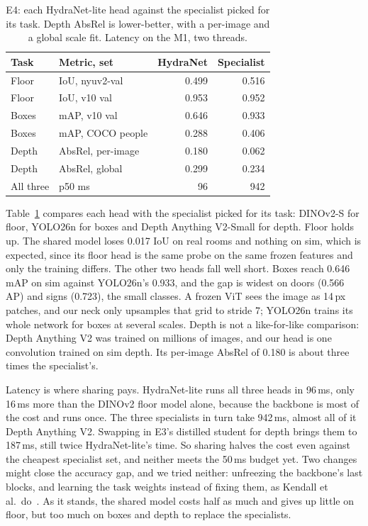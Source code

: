 \documentclass[conference]{IEEEtran}
\begin{document}
\begin{table}[t]
\caption{E4: each HydraNet-lite head against the specialist picked for its
task. Depth AbsRel is lower-better, with a per-image and a global scale fit.
Latency on the M1, two threads.}
\label{tab:e4}
\centering
\small
\begin{tabular}{@{}llrr@{}}
\toprule
Task & Metric, set & HydraNet & Specialist \\
\midrule
Floor & IoU, nyuv2-val & 0.499 & 0.516 \\
Floor & IoU, v10 val & 0.953 & 0.952 \\
Boxes & mAP, v10 val & 0.646 & 0.933 \\
Boxes & mAP, COCO people & 0.288 & 0.406 \\
Depth & AbsRel, per-image & 0.180 & 0.062 \\
Depth & AbsRel, global & 0.299 & 0.234 \\
\midrule
All three & p50 ms & 96 & 942 \\
\bottomrule
\end{tabular}
\end{table}

Table~\ref{tab:e4} compares each head with the specialist picked for its
task: DINOv2-S for floor, YOLO26n for boxes and Depth Anything V2-Small for
depth. Floor holds up. The shared model loses 0.017 IoU on real rooms and
nothing on sim, which is expected, since its floor head is the same probe on
the same frozen features and only the training differs. The other two heads
fall well short. Boxes reach 0.646 mAP on sim against YOLO26n's 0.933, and
the gap is widest on doors (0.566 AP) and signs (0.723), the small classes.
A frozen ViT sees the image as 14\,px patches, and our neck only upsamples
that grid to stride 7; YOLO26n trains its whole network for boxes at several
scales. Depth is not a like-for-like comparison: Depth Anything V2 was
trained on millions of images, and our head is one convolution trained on
sim depth. Its per-image AbsRel of 0.180 is about three times the
specialist's.

Latency is where sharing pays. HydraNet-lite runs all three heads in 96\,ms,
only 16\,ms more than the DINOv2 floor model alone, because the backbone is
most of the cost and runs once. The three specialists in turn take 942\,ms,
almost all of it Depth Anything V2. Swapping in E3's distilled student for
depth brings them to 187\,ms, still twice HydraNet-lite's time. So sharing
halves the cost even against the cheapest specialist set, and neither meets
the 50\,ms budget yet. Two changes might
close the accuracy gap, and we tried neither: unfreezing the backbone's last
blocks, and learning the task weights instead of fixing them, as Kendall et
al.\ do~\cite{kendall2018multitask}. As it stands, the shared model costs
half as much and gives up little on floor, but too much on boxes and depth
to replace the specialists.
\end{document}
